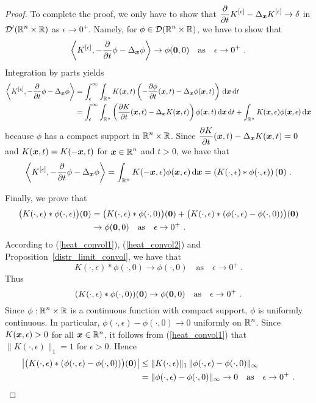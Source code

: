 \begin{proof}
To complete the proof, we only have to show that
$\displaystyle \pdfdx{K^{[\epsilon]}}{t} - \Delta_{\VEC{x}} K^{[\epsilon]}
\rightarrow \delta$ in $\displaystyle \DD'(\RR^n\times \RR)$ as
$\epsilon \to 0^+$.
Namely, for $\displaystyle \phi \in \DD(\RR^n\times \RR)$,
we have to show that
\[
\ps{K^{[\epsilon]}}{-\pdfdx{\phi}{t} - \Delta_{\VEC{x}} \phi}
\rightarrow \phi(\VEC{0},0) \quad \text{as} \quad \epsilon \to 0^+ \ .
\]
Integration by parts yields
\begin{align*}
\ps{K^{[\epsilon]}}{-\pdfdx{\phi}{t} - \Delta_{\VEC{x}} \phi}
&= \int_{\epsilon}^\infty \int_{\RR^n} K(\VEC{x},t) \left(
-\pdydx{\phi}{t}(\VEC{x},t) - \Delta_{\VEC{x}} \phi(\VEC{x},t)\right)
\dx{\VEC{x}} \dx{t} \\
&= \int_{\epsilon}^\infty \int_{\RR^n} \left( \pdydx{K}{t}(\VEC{x},t) 
-\Delta_{\VEC{x}} K(\VEC{x},t)\right) \phi(\VEC{x},t) \dx{\VEC{x}} \dx{t}
+ \int_{\RR^n} K(\VEC{x},\epsilon) \phi(\VEC{x},\epsilon) \dx{\VEC{x}}
\end{align*}
because $\phi$ has a compact support in $\displaystyle \RR^n\times \RR$.  Since
$\displaystyle \pdydx{K}{t}(\VEC{x},t) -\Delta_{\VEC{x}} K(\VEC{x},t) = 0$
and $K(\VEC{x},t) = K(-\VEC{x},t)$ for
$\displaystyle \VEC{x}\in \RR^n$ and $t>0$, we have
that
\[
\ps{K^{[\epsilon]}}{-\pdfdx{\phi}{t} - \Delta_{\VEC{x}} \phi}
= \int_{\RR^n} K(-\VEC{x},\epsilon) \phi(\VEC{x},\epsilon)
\dx{\VEC{x}}
= \left( K(\cdot,\epsilon) \ast \phi(\cdot, \epsilon)\right)(\VEC{0}) \ .
\]

Finally, we prove that
\begin{align*}
\big( K(\cdot,\epsilon) \ast \phi(\cdot, \epsilon)\big)(\VEC{0})
&= \big( K(\cdot,\epsilon) \ast \phi(\cdot, 0)\big)(\VEC{0}) +
\big( K(\cdot,\epsilon) \ast ( \phi(\cdot, \epsilon) -
\phi(\cdot, 0) ) \big)(\VEC{0}) \\
& \rightarrow \phi(\VEC{0},0) \quad \text{as} \quad \epsilon \to 0^+ \ .
\end{align*}
According to (\ref{heat_convol1}), (\ref{heat_convol2}) and
Proposition~\ref{distr_limit_convol}, we have that
\[
K(\cdot,\epsilon) \ast \phi(\cdot, 0) \rightarrow \phi(\cdot, 0)
\quad \text{as} \quad \epsilon \to 0^+ \ .
\]
Thus
\[
(K(\cdot,\epsilon) \ast \phi(\cdot, 0))(\VEC{0}) \rightarrow \phi(\VEC{0},0)
\quad \text{as} \quad \epsilon \to 0^+ \  .
\]
Since $\displaystyle \phi:\RR^n\times \RR$ is a continuous function with
compact support, $\phi$ is uniformly continuous.  In particular,
$\phi(\cdot, \epsilon) - \phi(\cdot, 0) \rightarrow 0$ 
uniformly on $\displaystyle \RR^n$.  Since $K(\VEC{x},\epsilon) >0$ for all
$\VEC{x}\in \RR^n$, it follows from (\ref{heat_convol1}) that
$\|K(\cdot,\epsilon)\|_1 = 1$ for $\epsilon >0$.  Hence
\begin{align*}
\left| \big( K(\cdot,\epsilon) \ast ( \phi(\cdot, \epsilon) -
\phi(\cdot, 0) )\big)(\VEC{0})  \right| &\leq
\| K(\cdot, \epsilon) \|_1 \,
\|\phi(\cdot, \epsilon) - \phi(\cdot, 0)\|_\infty \\
&= \|\phi(\cdot, \epsilon) - \phi(\cdot, 0)\|_\infty
\rightarrow 0 \quad \text{as} \quad \epsilon \to 0^+ \ . \qedhere
\end{align*}
\end{proof}

